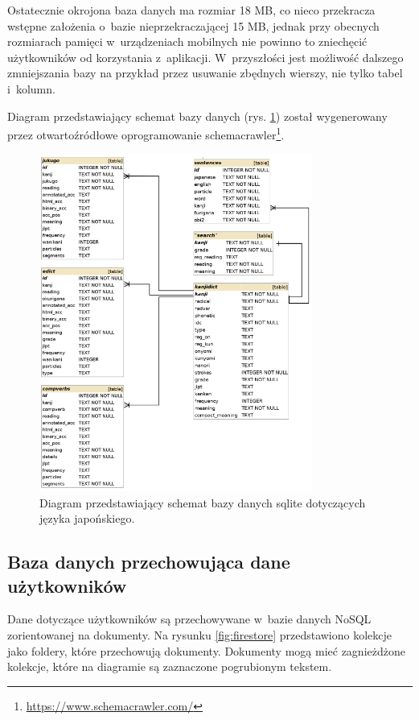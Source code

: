 \documentclass[a4paper,twoside,12pt]{book}
\begin{document}
Ostatecznie okrojona baza danych ma rozmiar 18 MB, co nieco przekracza wstępne założenia o~bazie nieprzekraczającej 15 MB, jednak przy obecnych rozmiarach pamięci w~urządzeniach mobilnych nie powinno to zniechęcić użytkowników od korzystania z~aplikacji. W~przyszłości jest możliwość dalszego zmniejszania bazy na przykład przez usuwanie zbędnych wierszy, nie tylko tabel i~kolumn.

Diagram przedstawiający schemat bazy danych (rys. \ref{fig:kanjidb}) został wygenerowany przez otwartoźródłowe oprogramowanie schemacrawler\footnote{\url{https://www.schemacrawler.com/}}.
\begin{figure}[]
\centering
\includegraphics[width=0.8\textwidth]{kanjidbrelations}
\caption{Diagram przedstawiający schemat bazy danych sqlite dotyczących języka japońskiego.}
\label{fig:kanjidb}
\end{figure}

\subsection{Baza danych przechowująca dane użytkowników}
\label{sec:4}

Dane dotyczące użytkowników są przechowywane w~bazie danych NoSQL zorientowanej na dokumenty. Na rysunku \ref{fig:firestore} przedstawiono kolekcje jako foldery, które przechowują dokumenty. Dokumenty mogą mieć zagnieżdżone kolekcje, które na diagramie są zaznaczone pogrubionym tekstem. 
\end{document}
